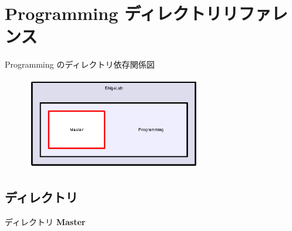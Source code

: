 \section{Programming ディレクトリリファレンス}
\label{dir_89d32e4e26b9b93c85c915e3b07e88b7}
Programming のディレクトリ依存関係図\nopagebreak
\begin{figure}[H]
\begin{center}
\leavevmode
\includegraphics[width=218pt]{dir_89d32e4e26b9b93c85c915e3b07e88b7_dep}
\end{center}
\end{figure}
\subsection*{ディレクトリ}
\begin{DoxyCompactItemize}
\item 
ディレクトリ {\bf Master}
\end{DoxyCompactItemize}
